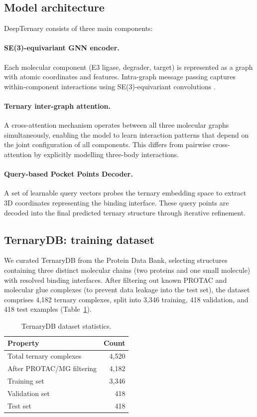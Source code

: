 \documentclass[11pt]{article}
\begin{document}
\subsection{Model architecture}
DeepTernary consists of three main components:

\paragraph{SE(3)-equivariant GNN encoder.} Each molecular component (E3 ligase, degrader, target) is represented as a graph with atomic coordinates and features. Intra-graph message passing captures within-component interactions using SE(3)-equivariant convolutions \citep{thomas2018,satorras2021}.

\paragraph{Ternary inter-graph attention.} A cross-attention mechanism operates between all three molecular graphs simultaneously, enabling the model to learn interaction patterns that depend on the joint configuration of all components. This differs from pairwise cross-attention by explicitly modelling three-body interactions.

\paragraph{Query-based Pocket Points Decoder.} A set of learnable query vectors probes the ternary embedding space to extract 3D coordinates representing the binding interface. These query points are decoded into the final predicted ternary structure through iterative refinement.

\subsection{TernaryDB: training dataset}
We curated TernaryDB from the Protein Data Bank, selecting structures containing three distinct molecular chains (two proteins and one small molecule) with resolved binding interfaces. After filtering out known PROTAC and molecular glue complexes (to prevent data leakage into the test set), the dataset comprises 4,182 ternary complexes, split into 3,346 training, 418 validation, and 418 test examples (Table~\ref{tab:dataset}).

\begin{table}[htbp]
\centering
\caption{TernaryDB dataset statistics.}
\label{tab:dataset}
\begin{tabular}{@{}lr@{}}
\toprule
Property & Count \\
\midrule
Total ternary complexes   & 4,520 \\
After PROTAC/MG filtering & 4,182 \\
Training set              & 3,346 \\
Validation set            & 418   \\
Test set                  & 418   \\
\bottomrule
\end{tabular}
\end{table}
\end{document}
